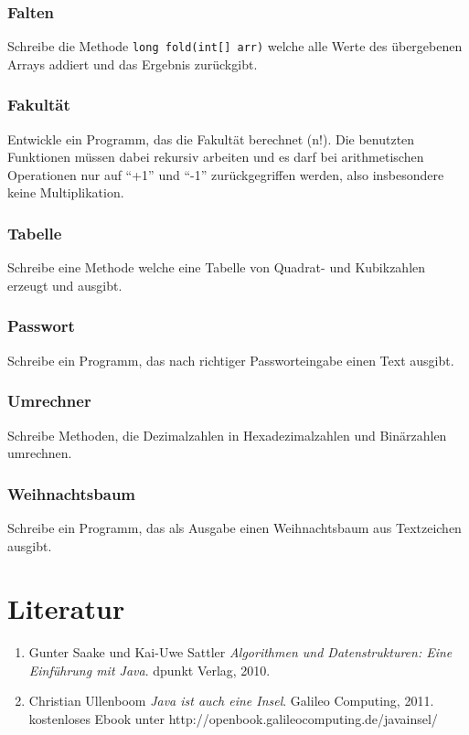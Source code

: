 		\subsubsection{Falten}
			Schreibe die Methode \lstinline$long fold(int[] arr)$ welche alle Werte des übergebenen Arrays addiert und das Ergebnis zurückgibt.
		\subsubsection{Fakultät}
			Entwickle ein Programm, das die Fakultät berechnet (n!). Die benutzten Funktionen müssen dabei rekursiv arbeiten und es darf bei arithmetischen Operationen nur auf ``+1'' und ``-1'' zurückgegriffen werden, also insbesondere keine Multiplikation.
		\subsubsection{Tabelle}
			Schreibe eine Methode welche eine Tabelle von Quadrat- und Kubikzahlen erzeugt und ausgibt.
		\subsubsection{Passwort}
			Schreibe ein Programm, das nach richtiger Passworteingabe einen Text ausgibt.
		\subsubsection{Umrechner}
			Schreibe Methoden, die Dezimalzahlen in Hexadezimalzahlen und Binärzahlen umrechnen.
		\subsubsection{Weihnachtsbaum}
			Schreibe ein Programm, das als Ausgabe einen Weihnachtsbaum aus Textzeichen ausgibt.


\section{Literatur}

\renewcommand{\labelenumi}{[\arabic{enumi}]}
\renewcommand{\theenumi}{[\arabic{enumi}]}
\begin{enumerate}
\item
Gunter Saake und Kai-Uwe Sattler \textit{Algorithmen und Datenstrukturen: Eine Einführung mit Java}. 
dpunkt Verlag, 2010.
\item
Christian Ullenboom \textit{Java ist auch eine Insel}. Galileo Computing, 2011. kostenloses Ebook unter http://openbook.galileocomputing.de/javainsel/

\end{enumerate}
\pagestyle{scrplain}
\ofoot[]{}

\cleardoublepage
%
